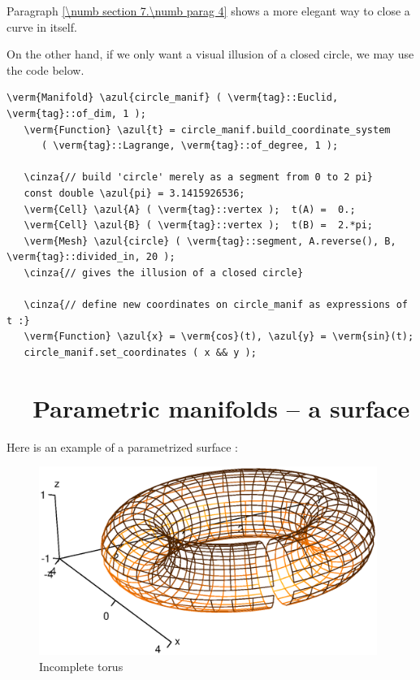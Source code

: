 Paragraph \ref{\numb section 7.\numb parag 4} shows a more elegant way to close a curve in itself.

On the other hand, if we only want a visual illusion of a closed circle, we may use the code below.

\begin{Verbatim}[commandchars=\\\{\},formatcom=\small\tt,baselinestretch=0.94]
   \verm{Manifold} \azul{circle_manif} ( \verm{tag}::Euclid, \verm{tag}::of_dim, 1 );
   \verm{Function} \azul{t} = circle_manif.build_coordinate_system
      ( \verm{tag}::Lagrange, \verm{tag}::of_degree, 1 );

   \cinza{// build 'circle' merely as a segment from 0 to 2 pi}
   const double \azul{pi} = 3.1415926536;
   \verm{Cell} \azul{A} ( \verm{tag}::vertex );  t(A) =  0.;
   \verm{Cell} \azul{B} ( \verm{tag}::vertex );  t(B) =  2.*pi;
   \verm{Mesh} \azul{circle} ( \verm{tag}::segment, A.reverse(), B, \verm{tag}::divided_in, 20 );
   \cinza{// gives the illusion of a closed circle}

   \cinza{// define new coordinates on circle_manif as expressions of t :}
   \verm{Function} \azul{x} = \verm{cos}(t), \azul{y} = \verm{sin}(t);
   circle_manif.set_coordinates ( x && y );
\end{Verbatim}


\section{~~Parametric manifolds -- a surface}\label{\numb section 2.\numb parag 15}

Here is an example of a parametrized surface :

\begin{figure}[b] \centering
  \includegraphics[width=110mm]{torus}
  \caption{Incomplete torus}
\end{figure}

